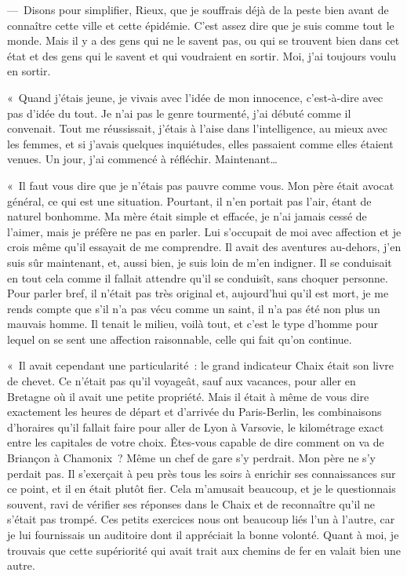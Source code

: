 \documentclass[french,twoside]{book} %
\begin{document}
— Disons pour simplifier, Rieux, que je souffrais déjà de la peste bien avant de connaître cette ville et cette épidémie. C’est assez dire que je suis comme tout le monde. Mais il y a des gens qui ne le savent pas, ou qui se trouvent bien dans cet état et des gens qui le savent et qui voudraient en sortir. Moi, j’ai toujours voulu en sortir.\par
« Quand j’étais jeune, je vivais avec l’idée de mon innocence, c’est-à-dire avec pas d’idée du tout. Je n’ai pas le genre tourmenté, j’ai débuté comme il convenait. Tout me réussissait, j’étais à l’aise dans l’intelligence, au mieux avec les femmes, et si j’avais quelques inquiétudes, elles passaient comme elles étaient venues. Un jour, j’ai commencé à réfléchir. Maintenant…\par
« Il faut vous dire que je n’étais pas pauvre comme vous. Mon père était avocat général, ce qui est une situation. Pourtant, il n’en portait pas l’air, étant de naturel bonhomme. Ma mère était simple et effacée, je n’ai jamais cessé de l’aimer, mais je préfère ne pas en parler. Lui s’occupait de moi avec affection et je crois même qu’il essayait de me comprendre. Il avait des aventures au-dehors, j’en suis sûr maintenant, et, aussi bien, je suis loin de m’en indigner. Il se conduisait en tout cela comme il fallait attendre qu’il se conduisît, sans choquer personne. Pour parler bref, il n’était pas très original et, aujourd’hui qu’il est mort, je me rends compte que s’il n’a pas vécu comme un saint, il n’a pas été non plus un mauvais homme. Il tenait le milieu, voilà tout, et c’est le type d’homme pour lequel on se sent une affection raisonnable, celle qui fait qu’on continue.\par
« Il avait cependant une particularité : le grand indicateur Chaix était son livre de chevet. Ce n’était pas qu’il voyageât, sauf aux vacances, pour aller en Bretagne où il avait une petite propriété. Mais il était à même de vous dire exactement les heures de départ et d’arrivée du Paris-Berlin, les combinaisons d’horaires qu’il fallait faire pour aller de Lyon à Varsovie, le kilométrage exact entre les capitales de votre choix. Êtes-vous capable de dire comment on va de Briançon à Chamonix ? Même un chef de gare s’y perdrait. Mon père ne s’y perdait pas. Il s’exerçait à peu près tous les soirs à enrichir ses connaissances sur ce point, et il en était plutôt fier. Cela m’amusait beaucoup, et je le questionnais souvent, ravi de vérifier ses réponses dans le Chaix et de reconnaître qu’il ne s’était pas trompé. Ces petits exercices nous ont beaucoup liés l’un à l’autre, car je lui fournissais un auditoire dont il appréciait la bonne volonté. Quant à moi, je trouvais que cette supériorité qui avait trait aux chemins de fer en valait bien une autre.\par
\end{document}
